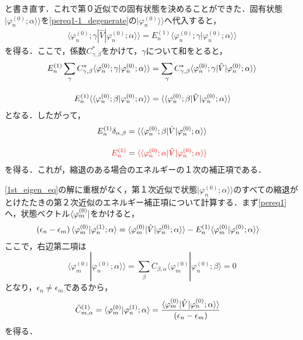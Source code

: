 と書き直す．これで第０近似での固有状態を決めることができた．固有状態$|\varphi^{(0)}_{n};\alpha\rangle\rangle$を\eqref{pereq1-1_degenerate}の$|\varphi^{(0)}_{n}\rangle\rangle$へ代入すると，
\begin{align}
\langle{\varphi^{(0)}_n;\gamma|\hat{V}|\varphi^{(0)}_n;\alpha}\rangle\rangle
=E^{(1)}_n
\langle \varphi^{(0)}_n;\gamma|\varphi^{(0)}_n;\alpha\rangle\rangle
\end{align}
を得る．ここで，係数$C_{\gamma,\beta}^{\ast}$をかけて，$\gamma$について和をとると，
\begin{align}
    E^{(1)}_n
    \sum_{\gamma}C_{\gamma,\beta}^{\ast}\langle \varphi^{(0)}_n;\gamma|\varphi^{(0)}_n;\alpha\rangle\rangle
    &=\sum_{\gamma}C_{\gamma,\beta}^{\ast}\langle{\varphi^{(0)}_n;\gamma|\hat{V}|\varphi^{(0)}_n;\alpha}\rangle\rangle\nn[10pt]
    E^{(1)}_n
    \langle\langle \varphi^{(0)}_n;\beta|\varphi^{(0)}_n;\alpha\rangle\rangle
    &=\langle\langle{\varphi^{(0)}_n;\beta|\hat{V}|\varphi^{(0)}_n;\alpha}\rangle\rangle
\end{align}
となる．したがって，
\begin{align}
    E^{(1)}_n\delta_{\alpha,\beta}
    &=\langle\langle{\varphi^{(0)}_n;\beta|\hat{V}|\varphi^{(0)}_n;\alpha}\rangle\rangle\\[10pt]
    \textcolor{red}{
    E^{(1)}_n}
    &=\textcolor{red}{\langle\langle{\varphi^{(0)}_n;\alpha|\hat{V}|\varphi^{(0)}_n;\alpha}\rangle\rangle}
\end{align}
を得る．これが，縮退のある場合のエネルギーの１次の補正項である．




\eqref{1st_eigen_eq}の解に重根がなく，第１次近似で状態$|\varphi^{(0)}_n;\alpha\rangle\rangle$のすべての縮退がとけたたきの第２次近似のエネルギー補正項について計算する．まず\eqref{pereq1}へ，状態ベクトル$\bra{\varphi^{(0)}_{m}}$をかけると，
\begin{align}
    (\epsilon_n-\epsilon_m)\braket{\varphi^{(0)}_{m}|\varphi^{(1)}_n;\alpha}
    &=\braket{\varphi^{(0)}_{m}|\hat{V}|\varphi^{(0)}_n;\alpha}\rangle
    -E^{(1)}_n\langle\varphi^{(0)}_{m}|\varphi^{(0)}_n;\alpha\rangle\rangle
\end{align}
ここで，右辺第二項は
\begin{equation}
    \langle\varphi^{(0)}_{m}|\varphi^{(0)}_n;\alpha\rangle\rangle
    = \sum_{\beta}C_{\beta,\alpha}\langle\varphi^{(0)}_{m}|\varphi^{(0)}_n;\beta\rangle
    =0
\end{equation}
となり，$\epsilon_n\neq\epsilon_m$であるから，
\begin{align}
    \Tilde{C}^{(1)}_{m,\alpha}=\braket{\varphi^{(0)}_{m}|\varphi^{(1)}_n;\alpha}
    &=\frac{\braket{\varphi^{(0)}_{m}|\hat{V}|\varphi^{(0)}_n;\alpha}\rangle}{(\epsilon_n-\epsilon_m)}
\end{align}
を得る．

